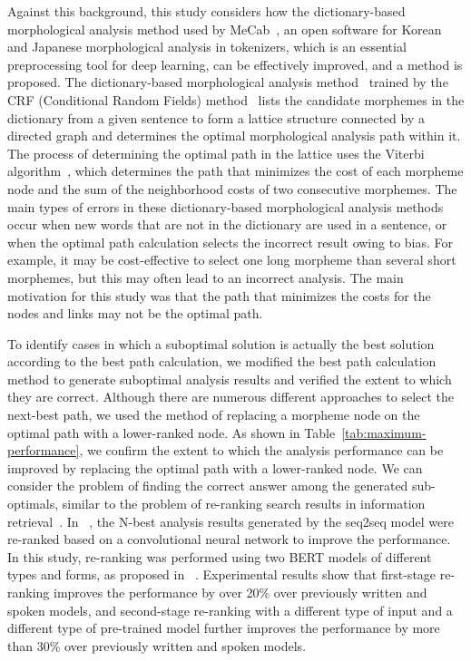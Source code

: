 \documentclass[AMS,STIX2COL]{WileyNJD-v2}
\begin{document}
    Against this background, this study considers how the dictionary-based morphological analysis method used by MeCab~\cite{MeCab}, an open software for Korean and Japanese morphological analysis in tokenizers, which is an essential preprocessing tool for deep learning, can be effectively improved, and a method is proposed.
    The dictionary-based morphological analysis method~\cite{Kudo2004, NaSH2014, NaSH2015, NaSH2018} trained by the CRF (Conditional Random Fields) method~\cite{Lafferty2001} lists the candidate morphemes in the dictionary from a given sentence to form a lattice structure connected by a directed graph and determines the optimal morphological analysis path within it.
    The process of determining the optimal path in the lattice uses the Viterbi algorithm~\cite{Viterbi1967}, which determines the path that minimizes the cost of each morpheme node and the sum of the neighborhood costs of two consecutive morphemes.
    The main types of errors in these dictionary-based morphological analysis methods occur when new words that are not in the dictionary are used in a sentence, or when the optimal path calculation selects the incorrect result owing to bias.
    For example, it may be cost-effective to select one long morpheme than several short morphemes, but this may often lead to an incorrect analysis.
    The main motivation for this study was that the path that minimizes the costs for the nodes and links may not be the optimal path.

    To identify cases in which a suboptimal solution is actually the best solution according to the best path calculation, we modified the best path calculation method to generate suboptimal analysis results and verified the extent to which they are correct.
    Although there are numerous different approaches to select the next-best path, we used the method of replacing a morpheme node on the optimal path with a lower-ranked node.
    As shown in Table~\ref{tab:maximum-performance}, we confirm the extent to which the analysis performance can be improved by replacing the optimal path with a lower-ranked node.
    We can consider the problem of finding the correct answer among the generated sub-optimals, similar to the problem of re-ranking search results in information retrieval~\cite{BaeYJ2021}.
    In ~\cite{ChoiYS2018}, the N-best analysis results generated by the seq2seq model were re-ranked based on a convolutional neural network to improve the performance.
    In this study, re-ranking was performed using two BERT models of different types and forms, as proposed in ~\cite{Nogueira2019}.
    Experimental results show that first-stage re-ranking improves the performance by over 20\% over previously written and spoken models, and second-stage re-ranking with a different type of input and a different type of pre-trained model further improves the performance by more than 30\% over previously written and spoken models.
\end{document}
